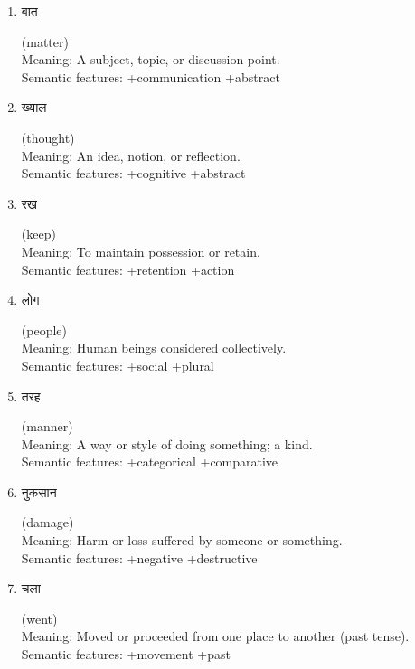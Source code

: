 \documentclass{article}
\begin{document}
\begin{enumerate}
\item \begin{hindi} बात \end{hindi} (matter) \\
Meaning: A subject, topic, or discussion point. \\
Semantic features: +communication +abstract

\item \begin{hindi} ख्याल \end{hindi} (thought) \\
Meaning: An idea, notion, or reflection. \\
Semantic features: +cognitive +abstract

\item \begin{hindi} रख \end{hindi} (keep) \\
Meaning: To maintain possession or retain. \\
Semantic features: +retention +action

\item \begin{hindi} लोग \end{hindi} (people) \\
Meaning: Human beings considered collectively. \\
Semantic features: +social +plural

\item \begin{hindi} तरह \end{hindi} (manner) \\
Meaning: A way or style of doing something; a kind. \\
Semantic features: +categorical +comparative

\item \begin{hindi} नुकसान \end{hindi} (damage) \\
Meaning: Harm or loss suffered by someone or something. \\
Semantic features: +negative +destructive

\item \begin{hindi} चला \end{hindi} (went) \\
Meaning: Moved or proceeded from one place to another (past tense). \\
Semantic features: +movement +past


\end{enumerate}
\end{document}
